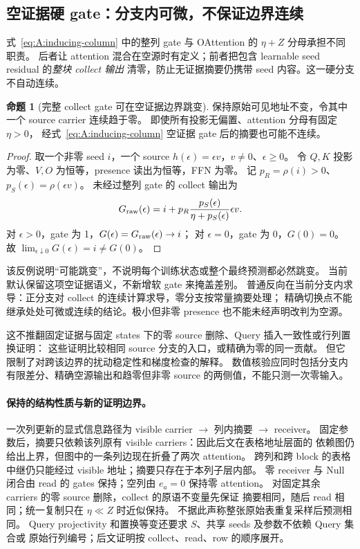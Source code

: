 \documentclass[11pt,UTF8,fontset=fandol]{ctexart}
\numberwithin{equation}{section}
\theoremstyle{definition}
\newtheorem{proposition}[definition]{命题}
\begin{document}
\subsection{空证据硬 gate：分支内可微，不保证边界连续}
\label{v53:sec:empty-gate-boundary}
式~\eqref{eq:A:inducing-column} 中的整列 gate 与 OAttention 的 $\eta+Z$ 分母承担不同职责。
后者让 attention 混合在空源时有定义；前者把包含 learnable seed residual 的\emph{整块 collect 输出}
清零，防止无证据摘要仍携带 seed 内容。这一硬分支不自动连续。

\begin{proposition}[完整 collect gate 可在空证据边界跳变]
保持原始可见地址不变，令其中一个 source carrier 连续趋于零。
即使所有投影无偏置、attention 分母有固定 $\eta>0$，
经式~\eqref{eq:A:inducing-column} 空证据 gate 后的摘要也可能不连续。
\end{proposition}
\begin{proof}
取一个非零 seed $i$，一个 source $h(\epsilon)=\epsilon v$，$v\ne0$、$\epsilon\ge0$。
令 $Q,K$ 投影为零、$V,O$ 为恒等，presence 读出为恒等，FFN 为零。
记 $p_R=\rho(i)>0$、$p_S(\epsilon)=\rho(\epsilon v)$。
未经过整列 gate 的 collect 输出为
\begin{equation}
 G_{\rm raw}(\epsilon)=i+
 p_R\frac{p_S(\epsilon)}{\eta+p_S(\epsilon)}\epsilon v.
 \label{v53:eq:empty-gate-counterexample}
\end{equation}
对 $\epsilon>0$，gate 为 1，$G(\epsilon)=G_{\rm raw}(\epsilon)\to i$；
对 $\epsilon=0$，gate 为 0，$G(0)=0$。
故 $\lim_{\epsilon\downarrow0}G(\epsilon)=i\ne G(0)$。
\end{proof}

该反例说明“可能跳变”，不说明每个训练状态或整个最终预测都必然跳变。
当前默认保留这项空证据语义，不新增软 gate 来掩盖差别。
普通反向在当前分支内求导：正分支对 collect 的连续计算求导，零分支按常量摘要处理；
精确切换点不能继承处处可微或连续的结论。极小但非零 presence 也不能未经声明改判为空源。

这不推翻固定证据与固定 states 下的零 source 删除、Query 插入一致性或行列置换证明：
这些证明比较相同 source 分支的入口，或精确为零的同一贡献。
但它限制了对跨该边界的扰动稳定性和梯度检查的解释。
数值核验应同时包括分支内有限差分、精确空源输出和趋零但非零 source 的两侧值，不能只测一次零输入。


\paragraph{保持的结构性质与新的证明边界。}
一次列更新的显式信息路径为 visible carrier $\to$ 列内摘要 $\to$ receiver。
固定参数后，摘要只依赖该列原有 visible carriers：因此后文在表格地址层面的
依赖图仍给出上界，但图中的一条列边现在折叠了两次 attention。
跨列和跨 block 的表格中继仍只能经过 visible 地址；摘要只存在于本列子层内部。
零 receiver 与 Null 闭合由 read 的 gates 保持；空列由 $e_a=0$ 保持零 attention。
对固定其余 carriers 的零 source 删除，collect 的原语不变量先保证
摘要相同，随后 read 相同；统一复制只在 $\eta\ll Z$ 时近似保持。
不据此声称整张原始表重复采样后预测相同。
Query projectivity 和置换等变还要求 $S$、共享 seeds 及参数不依赖 Query 集合或
原始行列编号；后文证明按 collect、read、row 的顺序展开。
\end{document}
